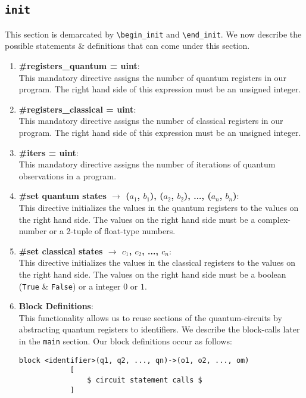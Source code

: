 \documentclass{article}
\begin{document}
\subsection{\texttt{init}}
This section is demarcated by \texttt{\textbackslash begin\_init} and \texttt{\textbackslash end\_init}. We now describe the possible statements \& definitions that can come under this section.
\begin{enumerate}
	\item \textbf{\#registers\_quantum = \textlangle uint\textrangle}: \\
		This mandatory directive assigns the number of quantum registers in our program. The right hand side of this expression must be an unsigned integer.
	\item \textbf{\#registers\_classical = \textlangle uint\textrangle}: \\
		This mandatory directive assigns the number of classical registers in our program. The right hand side of this expression must be an unsigned integer.
	\item \textbf{\#iters = \textlangle uint\textrangle}: \\
		This mandatory directive assigns the number of iterations of quantum observations in a program.
	\item \textbf{\#set quantum states $\rightarrow$ ($a_1$, $b_1$), ($a_2$, $b_2$), ..., ($a_n$, $b_n$)}: \\
		This directive initializes the values in the quantum registers to the values on the right hand side. The values on the right hand side must be a complex-number or a 2-tuple of float-type numbers.
	\item \textbf{\#set classical states $\rightarrow$ $c_1$, $c_2$, ..., $c_n$}: \\
		This directive initializes the values in the classical registers to the values on the right hand side. The values on the right hand side must be a boolean (\texttt{True} \& \texttt{False}) or a integer $0$ or $1$.
	\item \textbf{Block Definitions}: \\
		This functionality allows us to reuse sections of the quantum-circuits by abstracting quantum registers to identifiers. We describe the block-calls later in the \texttt{main} section. Our block definitions occur as follows:
		\begin{lstlisting}[caption=Block Definitions]
			block <identifier>(q1, q2, ..., qn)->(o1, o2, ..., om)
			[
				$ circuit statement calls $
			]
		\end{lstlisting}

\end{enumerate}
\end{document}

